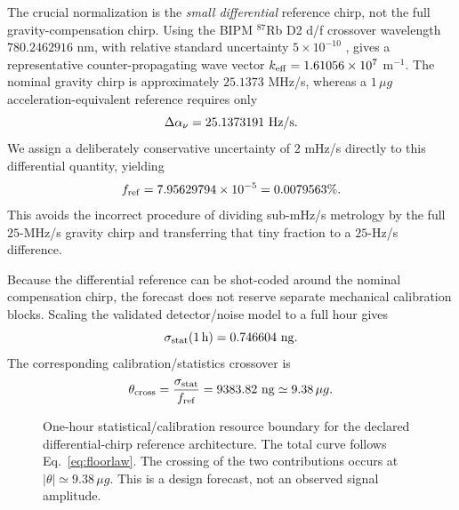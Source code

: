 The crucial normalization is the \emph{small differential} reference chirp, not the full gravity-compensation chirp. Using the BIPM $^{87}$Rb D2 d/f crossover wavelength $780.2462916$ nm, with relative standard uncertainty $5\times10^{-10}$ \cite{BIPM2015}, gives a representative counter-propagating wave vector $k_{\rm eff}=1.61056\times10^7$ m$^{-1}$. The nominal gravity chirp is approximately $25.1373$ MHz/s, whereas a $1\,\mu g$ acceleration-equivalent reference requires only
\begin{equation}
\Delta\alpha_\nu=25.1373191\ {\rm Hz/s}.
\end{equation}
We assign a deliberately conservative uncertainty of $2$ mHz/s directly to this differential quantity, yielding
\begin{equation}
f_{\rm ref}=7.95629794\times10^{-5}
=0.0079563\%.
\label{eq:fref}
\end{equation}
This avoids the incorrect procedure of dividing sub-mHz/s metrology by the full $25$-MHz/s gravity chirp and transferring that tiny fraction to a $25$-Hz/s difference.

Because the differential reference can be shot-coded around the nominal compensation chirp, the forecast does not reserve separate mechanical calibration blocks. Scaling the validated detector/noise model to a full hour gives
\begin{equation}
\sigma_{\rm stat}(1\,{\rm h})=0.746604\ {\rm ng}.
\label{eq:onehour}
\end{equation}
The corresponding calibration/statistics crossover is
\begin{equation}
\theta_{\rm cross}=\frac{\sigma_{\rm stat}}{f_{\rm ref}}
=9383.82\ {\rm ng}\simeq9.38\,\mu g.
\label{eq:crossover}
\end{equation}

\begin{figure}[t]
\centering
{}
\caption{One-hour statistical/calibration resource boundary for the declared differential-chirp reference architecture. The total curve follows Eq.~\eqref{eq:floorlaw}. The crossing of the two contributions occurs at $|\theta|\simeq9.38\,\mu g$. This is a design forecast, not an observed signal amplitude.}
\label{fig:crossover}
\end{figure}

